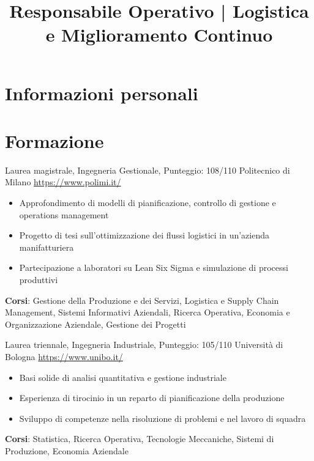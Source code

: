 \documentclass[a4paper, serif, 10pt]{moderncv}
\title{Responsabile Operativo | Logistica e Miglioramento Continuo}
\begin{document}
\maketitle

\section{Informazioni personali}

\section{Formazione}

        {Laurea magistrale, Ingegneria Gestionale, Punteggio: 108/110}
        {Politecnico di Milano}
        {\url{https://www.polimi.it/}}
        {}
        {\begin{itemize}
\item Approfondimento di modelli di pianificazione, controllo di gestione e operations management
\item Progetto di tesi sull'ottimizzazione dei flussi logistici in un'azienda manifatturiera
\item Partecipazione a laboratori su Lean Six Sigma e simulazione di processi produttivi
\end{itemize}
\textbf{Corsi}: Gestione della Produzione e dei Servizi, Logistica e Supply Chain Management, Sistemi Informativi Aziendali, Ricerca Operativa, Economia e Organizzazione Aziendale, Gestione dei Progetti}

        {Laurea triennale, Ingegneria Industriale, Punteggio: 105/110}
        {Università di Bologna}
        {\url{https://www.unibo.it/}}
        {}
        {\begin{itemize}
\item Basi solide di analisi quantitativa e gestione industriale
\item Esperienza di tirocinio in un reparto di pianificazione della produzione
\item Sviluppo di competenze nella risoluzione di problemi e nel lavoro di squadra
\end{itemize}
\textbf{Corsi}: Statistica, Ricerca Operativa, Tecnologie Meccaniche, Sistemi di Produzione, Economia Aziendale}
\end{document}
